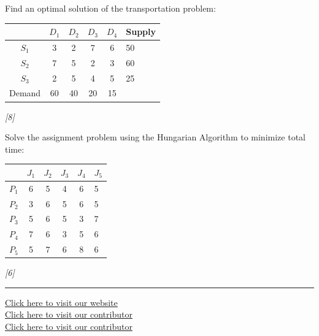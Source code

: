 \documentclass[11pt,a4paper]{article}
\newcommand{\pts}[1]{\hfill   \textit{[#1]}}
\begin{document}
\begin{parts}
  \item Find an optimal solution of the transportation problem:
  
\begin{center}
  
\begin{tabular}{|cccc|c}
  \hline
   & $D_1$ & $D_2$ & $D_3$ & $D_4$ & Supply \\
  \hline
  $S_1$ & 3 & 2 & 7 & 6 & 50 \\
  $S_2$ & 7 & 5 & 2 & 3 & 60 \\
  $S_3$ & 2 & 5 & 4 & 5 & 25 \\
  \hline
  Demand & 60 & 40 & 20 & 15 & \\
  \hline
  \end{tabular}
  \end{center} \pts{8}
  \item Solve the assignment problem using the Hungarian Algorithm to minimize total time:
  
\begin{center}
  
\begin{tabular}{|ccccc}
  \hline
   & $J_1$ & $J_2$ & $J_3$ & $J_4$ & $J_5$ \\
  \hline
  $P_1$ & 6 & 5 & 4 & 6 & 5 \\
  $P_2$ & 3 & 6 & 5 & 6 & 5 \\
  $P_3$ & 5 & 6 & 5 & 3 & 7 \\
  $P_4$ & 7 & 6 & 3 & 5 & 6 \\
  $P_5$ & 5 & 7 & 6 & 8 & 6 \\
  \hline
  \end{tabular}
  \end{center} \pts{6}
\end{parts}

\vfill\rule{\linewidth}{0.4pt}

\begin{center}\small
  \href{https://bhu-exam.vercel.app/}{Click here to visit our website}\\[4pt]
  \href{https://me-aryan.vercel.app/}{Click here to visit our contributor}\\[4pt]
  \href{https://quashan-me.vercel.app/}{Click here to visit our contributor}
\end{center}
\end{document}
